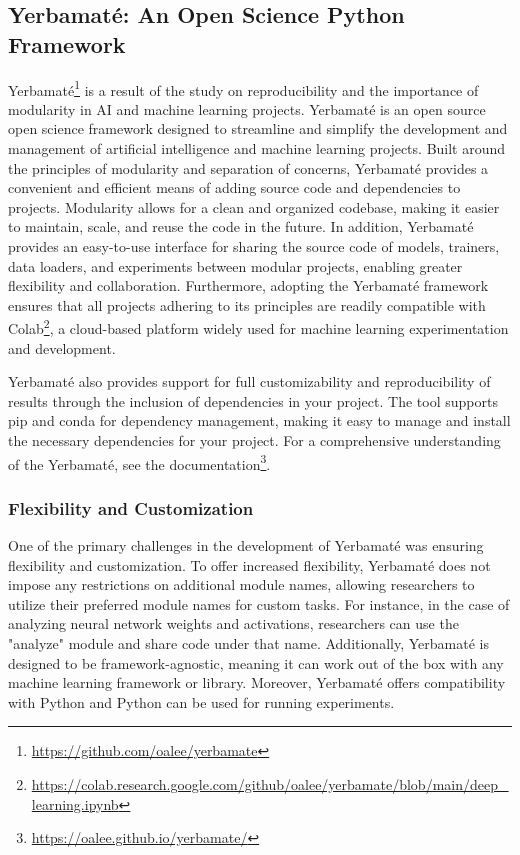 \documentclass{article}
\begin{document}
\subsection{Yerbamaté: An Open Science Python Framework}
Yerbamaté\footnote{\url{https://github.com/oalee/yerbamate}} is a result of the study on reproducibility and the importance of modularity in AI and machine learning projects. Yerbamaté is an open source open science framework designed to streamline and simplify the development and management of artificial intelligence and machine learning projects. Built around the principles of modularity and separation of concerns, Yerbamaté provides a convenient and efficient means of adding source code and dependencies to projects. Modularity allows for a clean and organized codebase, making it easier to maintain, scale, and reuse the code in the future. In addition, Yerbamaté provides an easy-to-use interface for sharing the source code of models, trainers, data loaders, and experiments between modular projects, enabling greater flexibility and collaboration. Furthermore, adopting the Yerbamaté framework ensures that all projects adhering to its principles are readily compatible with Colab\footnote{\url{https://colab.research.google.com/github/oalee/yerbamate/blob/main/deep_learning.ipynb}}, a cloud-based platform widely used for machine learning experimentation and development.

Yerbamaté also provides support for full customizability and reproducibility of results through the inclusion of dependencies in your project. The tool supports pip and conda for dependency management, making it easy to manage and install the necessary dependencies for your project.
For a comprehensive understanding of the Yerbamaté, see the documentation\footnote{\url{https://oalee.github.io/yerbamate/}}.


\subsubsection{Flexibility and Customization}
One of the primary challenges in the development of Yerbamaté was ensuring flexibility and customization.
To offer increased flexibility, Yerbamaté does not impose any restrictions on additional module names, allowing researchers to utilize their preferred module names for custom tasks. For instance, in the case of analyzing neural network weights and activations, researchers can use the "analyze" module and share code under that name.  Additionally, Yerbamaté is designed to be framework-agnostic, meaning it can work out of the box with any machine learning framework or library.  Moreover, Yerbamaté offers compatibility with Python and Python can be used for running experiments. 
\end{document}
